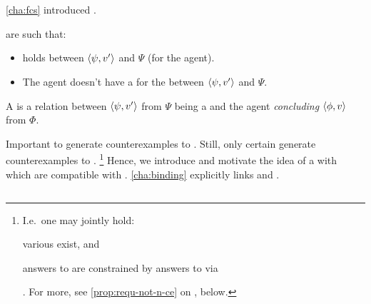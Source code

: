 \chapter{}
\label{cha:requs}

\begin{note}
  \autoref{cha:fcs} introduced .

   are such that:
  \begin{itemize}
  \item
    \ros{} holds between \(\langle \psi, v' \rangle\) and \(\Psi\) (for the agent).
  \item
    The agent doesn't have a \wit{} for the \ros{} between \(\langle \psi, v' \rangle\) and \(\Psi\).
  \end{itemize}

  A \requ{} is a relation between \(\langle \psi, v' \rangle\) from \(\Psi\) being a \fc{} and the agent \emph{concluding} \(\langle \phi, v \rangle\) from \(\Phi\).
\end{note}

\begin{note}
  Important to generate counterexamples to \issueConstraint{}.
  Still, only certain  generate counterexamples to \issueConstraint{}.%
  \footnote{
    I.e.\ one may jointly hold:
    \begin{enumerate*}[label=(\alph*)]
    \item
      various  exist, and
    \item
      answers to \qWhyV{} are constrained by answers to \qHowV{} via \issueConstraint{}
    \end{enumerate*}%
    .
    For more, see \autoref{prop:requ-not-n-ce} on , below.
  }
  Hence, we introduce and motivate the idea of a  with  which are compatible with \issueConstraint{}.
  \autoref{cha:binding} explicitly links  and \issueConstraint{}.
\end{note}

\section{}
\label{cha:requs:requs}

